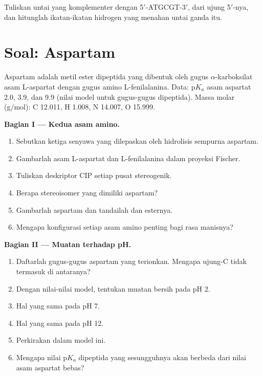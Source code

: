 \begin{exercise}[$\star\star\star$]\label{exo:b2:biomolecules:12}
Tuliskan untai yang komplementer dengan 5$'$-ATGCGT-3$'$, dari ujung 5$'$-nya,
dan hitunglah ikatan-ikatan hidrogen yang menahan untai ganda itu.
\end{exercise}

\section{Soal: Aspartam}

\begin{problem}
\label{pb:b2:biomolecules:1}
Aspartam adalah metil ester dipeptida yang dibentuk oleh gugus
$\alpha$-karboksilat asam L-aspartat
dengan gugus amino L-fenilalanina. Data: $\mathrm pK_a$ asam aspartat 2.0,
3.9, dan 9.9 (nilai model untuk gugus-gugus dipeptida). Massa molar
(\unit{g/mol}): C 12.011, H 1.008, N 14.007,
O 15.999.

\medskip
\noindent\textbf{Bagian I --- Kedua asam amino.}
\begin{enumerate}
  \item Sebutkan ketiga senyawa yang dilepaskan oleh hidrolisis sempurna aspartam.
  \item Gambarlah asam L-aspartat dan L-fenilalanina dalam proyeksi Fischer.
  \item Tuliskan deskriptor CIP setiap pusat stereogenik.
  \item Berapa stereoisomer yang dimiliki aspartam?
  \item Gambarlah aspartam dan tandailah  dan esternya.
  \item Mengapa konfigurasi setiap asam amino penting bagi rasa manisnya?
\end{enumerate}

\medskip
\noindent\textbf{Bagian II --- Muatan terhadap pH.}
\begin{enumerate}[resume]
  \item Daftarlah gugus-gugus aspartam yang terionkan. Mengapa ujung-C tidak
        termasuk di antaranya?
  \item Dengan nilai-nilai model, tentukan muatan bersih pada pH 2.
  \item Hal yang sama pada pH 7.
  \item Hal yang sama pada pH 12.
  \item Perkirakan  dalam model ini.
  \item Mengapa nilai $\mathrm pK_a$ dipeptida yang sesungguhnya akan
        berbeda dari nilai asam aspartat bebas?
\end{enumerate}


\end{problem}
